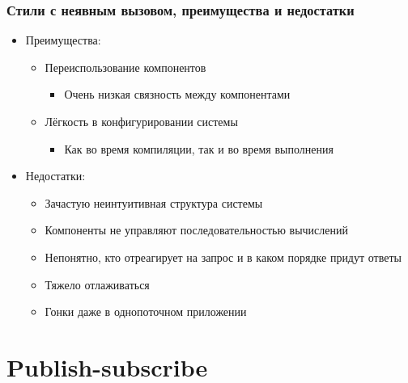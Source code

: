 \documentclass[xetex,mathserif,serif]{beamer}
\begin{document}
    \begin{frame}
        \frametitle{Стили с неявным вызовом, преимущества и недостатки}
        \begin{itemize}
            \item Преимущества:
            \begin{itemize}
                \item Переиспользование компонентов
                \begin{itemize}
                    \item Очень низкая связность между компонентами
                \end{itemize}
                \item Лёгкость в конфигурировании системы
                \begin{itemize}
                    \item Как во время компиляции, так и во время выполнения
                \end{itemize}
            \end{itemize}
            \item Недостатки:
            \begin{itemize}
                \item Зачастую неинтуитивная структура системы
                \item Компоненты не управляют последовательностью вычислений
                \item Непонятно, кто отреагирует на запрос и в каком порядке придут ответы
                \item Тяжело отлаживаться
                \item Гонки даже в однопоточном приложении
            \end{itemize}
        \end{itemize}
    \end{frame}

    \section{Publish-subscribe}
\end{document}
